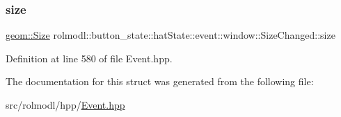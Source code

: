 \subsubsection{\texorpdfstring{size}{size}}
{\footnotesize\ttfamily \mbox{\hyperlink{structrolmodl_1_1geom_1_1_size}{geom\+::\+Size}} rolmodl\+::button\+\_\+state\+::hat\+State\+::event\+::window\+::\+Size\+Changed\+::size}



Definition at line 580 of file Event.\+hpp.



The documentation for this struct was generated from the following file\+:\begin{DoxyCompactItemize}
\item 
src/rolmodl/hpp/\mbox{\hyperlink{_event_8hpp}{Event.\+hpp}}\end{DoxyCompactItemize}

